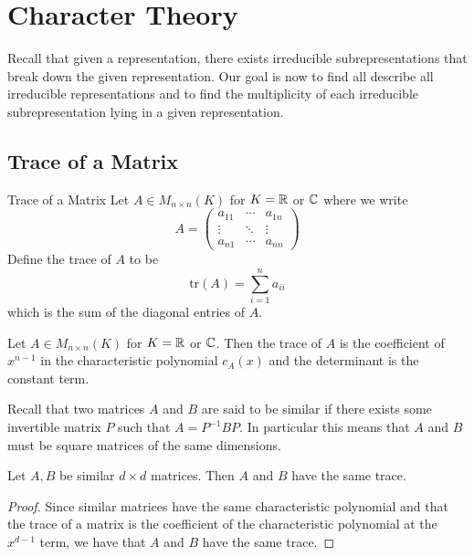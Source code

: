 \documentclass[a4paper]{article}
\begin{document}
\pagebreak
\section{Character Theory}
Recall that given a representation, there exists irreducible subrepresentations that break down the given representation. Our goal is now to find all describe all irreducible representations and to find the multiplicity of each irreducible subrepresentation lying in a given representation. 

\subsection{Trace of a Matrix}
\begin{defn}{Trace of a Matrix}{} Let $A\in M_{n\times n}(K)$ for $K=\mathbb{R}$ or $\mathbb{C}$ where we write $$A=\begin{pmatrix}
a_{11} & \cdots & a_{1n}\\
\vdots & \ddots & \vdots\\
a_{n1} & \cdots & a_{nn}
\end{pmatrix}$$ Define the trace of $A$ to be $$\text{tr}(A)=\sum_{i=1}^na_{ii}$$ which is the sum of the diagonal entries of $A$. 
\end{defn}

\begin{prp}{}{} Let $A\in M_{n\times n}(K)$ for $K=\mathbb{R}$ or $\mathbb{C}$. Then the trace of $A$ is the coefficient of $x^{n-1}$ in the characteristic polynomial $c_A(x)$ and the determinant is the constant term. 
\end{prp}

Recall that two matrices $A$ and $B$ are said to be similar if there exists some invertible matrix $P$ such that $A=P^{-1}BP$. In particular this means that $A$ and $B$ must be square matrices of the same dimensions. 

\begin{lmm}{}{} Let $A,B$ be similar $d\times d$ matrices. Then $A$ and $B$ have the same trace. \tcbline
\begin{proof}
Since similar matrices have the same characteristic polynomial and that the trace of a matrix is the coefficient of the characteristic polynomial at the $x^{d-1}$ term, we have that $A$ and $B$ have the same trace. 
\end{proof}
\end{lmm}
\end{document}
